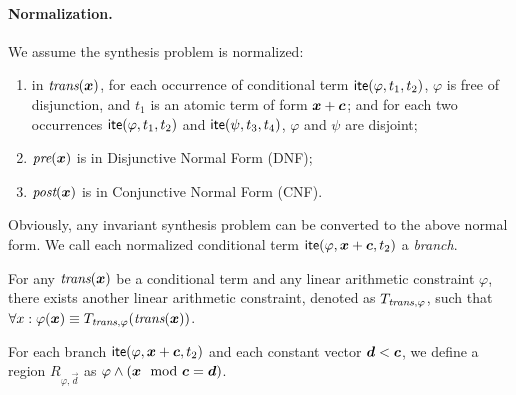\documentclass[runningheads]{llncs}
\begin{document}
\paragraph{Normalization.} 
We assume the synthesis problem is normalized:
\begin{enumerate}
\item in $\trans(\vecx)$, for each occurrence of conditional term $\textsf{ite}(\varphi, t_1, t_2)$, $\varphi$ is free of disjunction, and $t_1$ is an atomic term of form $\vecx + \vecc$; and for each two occurrences $\textsf{ite}(\varphi, t_1, t_2)$ and $\textsf{ite}(\psi, t_3, t_4)$, $\varphi$ and $\psi$ are disjoint;
\item $\pre(\vecx)$ is in Disjunctive Normal Form (DNF);
\item $\post(\vecx)$ is in Conjunctive Normal Form (CNF).
\end{enumerate}
Obviously, any invariant synthesis problem can be converted to the above normal form. 
We call each normalized conditional term $\ite(\varphi, \vecx + \vecc, t_2)$ a \emph{branch}.

\begin{theorem}
For any $\trans(\vecx)$ be a conditional term and any linear arithmetic constraint $\varphi$, there exists another linear arithmetic constraint, denoted as $T_{\textit{trans},\varphi}$, such that $\forall x: \varphi(\vecx) \equiv T_{\trans,\varphi}(\trans(\vecx))$.
\end{theorem}

\begin{definition}[Region]
For each branch $\ite(\varphi, \vecx + \vecc, t_2)$ and each constant vector $\vec{d} < \vecc$, we define a region $R_{\varphi, \vec{d}}$ as $\varphi \wedge (\vecx \mod \vecc = \vec{d})$.
\end{definition}





\appendix
%
\end{document}
